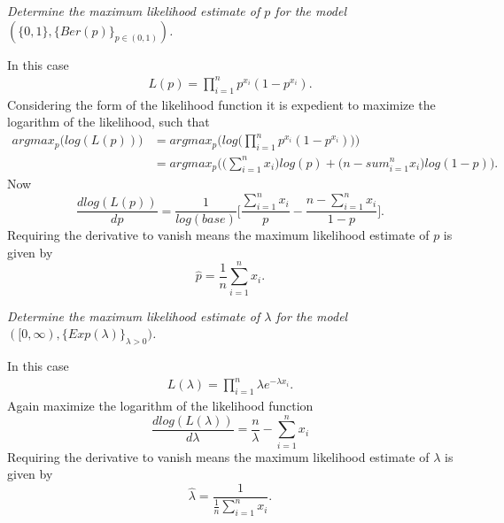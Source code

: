 \begin{example}
	\emph{Determine the maximum likelihood estimate of $p$ for the model $(\{0,1\},\{Ber(p)\}_{p\in(0,1)})$.}\newline
	
	\noindent In this case
	\begin{equation}
		\begin{split}
			L(p)=\prod_{i=1}^np^{x_i}(1-p^{x_i}).
		\end{split}
	\end{equation}
	Considering the form of the likelihood function it is expedient to maximize the logarithm of the likelihood, such that
	\begin{equation}
		\begin{split}
			argmax_p\bigg(log(L(p))\bigg)&= argmax_p\bigg(log\bigg(\prod_{i=1}^np^{x_i}(1-p^{x_i})\bigg)\bigg)\\
			&= argmax_{p}\bigg(\bigg(\sum_{i=1}^nx_i\bigg)log(p)+\bigg(n-sum_{i=1}^nx_i\bigg)log(1-p)\bigg).
		\end{split}
	\end{equation}
	Now 
	\begin{equation}
		\frac{dlog(L(p))}{dp}=\frac{1}{log(base)}\bigg[\frac{\sum_{i=1}^nx_i}{p}-\frac{n-\sum_{i=1}^nx_i}{1-p}\bigg].
	\end{equation}
	Requiring the derivative to vanish means the maximum likelihood estimate of $p$ is given by
	\begin{equation}
		\hat{p}=\frac{1}{n}\sum_{i=1}^nx_i.
	\end{equation}
\end{example}
\begin{example}
	\emph{Determine the maximum likelihood estimate of $\lambda$ for the model $([0,\infty),\{Exp(\lambda)\}_{\lambda>0})$.}\newline
	
	\noindent In this case
	\begin{equation}
		\begin{split}
			L(\lambda)=\prod_{i=1}^n\lambda e^{-\lambda x_i}.
		\end{split}
	\end{equation}
	Again maximize the logarithm of the likelihood function
	\begin{equation}
		\frac{dlog(L(\lambda))}{d\lambda}=\frac{n}{\lambda}-\sum_{i=1}^nx_i
	\end{equation}
	Requiring the derivative to vanish means the maximum likelihood estimate of $\lambda$ is given by
	\begin{equation}
		\hat{\lambda}=\frac{1}{\frac{1}{n}\sum_{i=1}^nx_i}.
	\end{equation}
\end{example}

